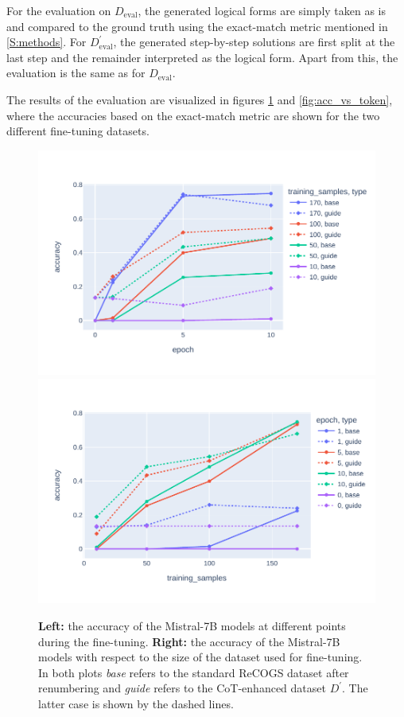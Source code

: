 \documentclass[11pt]{article}
\begin{document}
    For the evaluation on $D_\mathrm{eval}$, the generated logical forms are simply taken as is and compared to the ground
    truth using the exact-match metric mentioned in \ref{S:methods}.
    For $D_\mathrm{eval}^\prime$, the generated step-by-step solutions are first split at the last step and the remainder
    interpreted as the logical form.
    Apart from this, the evaluation is the same as for $D_\mathrm{eval}$.

    The results of the evaluation are visualized in figures  \ref{fig:acc_vs_data_and_epoch} and  \ref{fig:acc_vs_token},
    where the accuracies based on the exact-match metric are shown for the two different fine-tuning datasets.

    \begin{figure}
        \centering
        \includegraphics[width=0.49\linewidth]{../plots/accuracy_vs_epoch.pdf}
        \includegraphics[width=0.49\linewidth]{../plots/accuracy_vs_data.pdf}
        \caption{
            \textbf{Left:} the accuracy of the Mistral-7B models at different points during the fine-tuning.
            \textbf{Right:} the accuracy of the Mistral-7B models with respect to the size of the dataset used for fine-tuning.\\
            In both plots \emph{base} refers to the standard ReCOGS dataset after renumbering and \emph{guide}
            refers to the CoT-enhanced dataset $D^\prime$. The latter case is shown by the dashed lines.
        }
        \label{fig:acc_vs_data_and_epoch}
    \end{figure}
\end{document}
